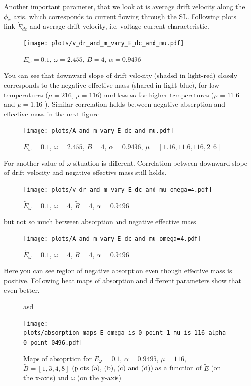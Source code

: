 \documentclass[40pt,letterpaper,physrev]{article}
\begin{document}
    Another important parameter, that we look at is average drift velocity along the $\phi_x$ axis, which corresponds 
    to current flowing through the SL. Following plots link $\tilde{E}_{dc}$ and average drift velocity, i.e. 
    voltage-current characteristic.
   	\begin{figure}[H]
	  \centering
	  \normalsize %
	  \texttt{[image: plots/v\_dr\_and\_m\_vary\_E\_dc\_and\_mu.pdf]}
	  \caption{$E_\omega=0.1$, $\omega=2.455$, $B=4$, $\alpha=0.9496$}
	  \label{fig:effect_of_temperature_in_v_dr_vary_E_dc_omega=2.455}	  
	\end{figure}	
	You can see that downward slope of drift velocity (shaded in light-red) closely corresponds to the negative effective
	mass (shared in light-blue), for low temperatures ($\mu = 216$, $\mu = 116$) and less so for higher 
	temperatures ($\mu = 11.6$ and $\mu = 1.16$ ). Similar correlation holds between negative absorption and effective
	mass in the next figure.
	\begin{figure}[H]
	  \centering
	  \normalsize %
	  \texttt{[image: plots/A\_and\_m\_vary\_E\_dc\_and\_mu.pdf]}
	  \caption{$E_\omega=0.1$, $\omega=2.455$, $B=4$, $\alpha=0.9496$, $\mu=[1.16, 11.6, 116, 216]$}
	  \label{fig:effect_of_temperature_in_A_vary_E_dc_omega=2.455}
	\end{figure}	
	For another value of $\omega$ situation is different. Correlation between downward slope of drift velocity and 
	negative effective mass still holds.
	\begin{figure}[H]
	  \centering
	  \normalsize %
	  \texttt{[image: plots/v\_dr\_and\_m\_vary\_E\_dc\_and\_mu\_omega=4.pdf]}
	  \caption{$\tilde{E}_\omega=0.1$, $\omega=4$, $\tilde{B}=4$, $\alpha=0.9496$}
	  \label{fig:effect_of_temperature_in_v_dr_vary_E_dc_omega=4}	  
	\end{figure}
	but not so much between absorption and negative effective mass
	\begin{figure}[H]
	  \centering
	  \normalsize %
	  \texttt{[image: plots/A\_and\_m\_vary\_E\_dc\_and\_mu\_omega=4.pdf]}
	  \caption{$\tilde{E}_\omega=0.1$, $\omega=4$, $\tilde{B}=4$, $\alpha=0.9496$}
	  \label{fig:effect_of_temperature_in_A_vary_E_dc_omega=4}
	\end{figure}
	Here you can see region of negative absorption even though effective mass is positive. Following heat maps of
absorption and different parameters show that even better.
	\begin{figure}[H]
	  \centering
	  \normalsize %
	  
	 
	 
asd	  
	  
	  \texttt{[image: plots/absorption\_maps\_E\_omega\_is\_0\_point\_1\_mu\_is\_116\_alpha\_0\_point\_0496.pdf]}
	  \caption{Maps of absoprtion for $E_\omega=0.1$, $\alpha=0.9496$, $\mu=116$, $\tilde{B}=[1,3,4,8]$ 
	  (plots (a), (b), (c) and (d)) as a function of $\tilde{E}$ (on the x-axis) and $\omega$ (on the y-axis)}
	  \label{fig:absorption}	  
	\end{figure}
\end{document}
